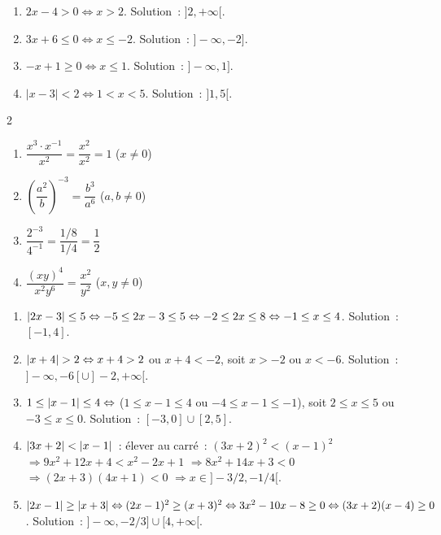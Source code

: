 
\begin{enumerate}
  \item $2x-4>0\Leftrightarrow x>2$. Solution~: $]2,+\infty[$.
  \item $3x+6\leq0\Leftrightarrow x\leq-2$. Solution~: $]-\infty,-2]$.
  \item $-x+1\geq0\Leftrightarrow x\leq1$. Solution~: $]-\infty,1]$.
  \item $|x-3|<2\Leftrightarrow1<x<5$. Solution~: $]1,5[$.
\end{enumerate}


\begin{multicols}{2}
\begin{enumerate}
  \item $\dfrac{x^3\cdot x^{-1}}{x^2}=\dfrac{x^2}{x^2}=1$ ($x\ne0$)
  \item $\left(\dfrac{a^2}{b}\right)^{-3}=\dfrac{b^3}{a^6}$ ($a,b\ne0$)
  \item $\dfrac{2^{-3}}{4^{-1}}=\dfrac{1/8}{1/4}=\dfrac12$
  \item $\dfrac{(xy)^4}{x^2y^6}=\dfrac{x^2}{y^2}$ ($x,y\ne0$)
\end{enumerate}
\end{multicols}


\begin{enumerate}
  \item $\left|2x-3\right|\leq5\Leftrightarrow-5\leq2x-3\leq5\Leftrightarrow
        -2\leq2x\leq8\Leftrightarrow-1\leq x\leq4$.
        Solution~: $[-1,4]$.
  \item $\abs{x+4}>2\Leftrightarrow x+4>2$ ou $x+4<-2$,
        soit $x>-2$ ou $x<-6$.
        Solution~: $]-\infty,-6[\cup]-2,+\infty[$.
  \item $1\leq\left|x-1\right|\leq4\Leftrightarrow$
        ($1\leq x-1\leq4$ ou $-4\leq x-1\leq-1$),
        soit $2\leq x\leq5$ ou $-3\leq x\leq0$.
        Solution~: $[-3,0]\cup[2,5]$.
  \item $\left|3x+2\right|<\left|x-1\right|$~: \'elever au carr\'e~:
        $(3x+2)^2<(x-1)^2$
        $\Rightarrow9x^2+12x+4<x^2-2x+1$
        $\Rightarrow8x^2+14x+3<0$
        $\Rightarrow(2x+3)(4x+1)<0$
        $\Rightarrow x\in]-3/2,-1/4[$.
  \item $\left|2x-1\right|\geq\left|x+3\right|\Leftrightarrow
        (2x-1)^2\geq(x+3)^2\Leftrightarrow
        3x^2-10x-8\geq0\Leftrightarrow(3x+2)(x-4)\geq0$.
        Solution~: $]-\infty,-2/3]\cup[4,+\infty[$.
\end{enumerate}


